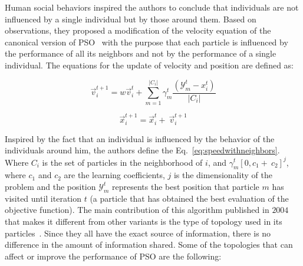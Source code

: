 Human social behaviors inspired the authors to conclude that individuals are not influenced by a single individual but by those around them. Based on observations, they proposed a modification of the velocity equation of the canonical version of PSO~\cite{kennedy1995particle} with the purpose that each particle is influenced by the performance of all its neighbors and not by the performance of a single individual. The equations for the update of velocity and position are defined as: 

\begin{equation}\label{eq:speedwithneighbors}
      \vec{v}_i^{t+1}=w\vec{v}_i^t+\sum_{m=1}^{\left|C_i\right|}{\gamma_m^t\frac{(\mathcal{Y}_m^t-x_i^t)}{\left|C_i\right|}}
\end{equation}

\begin{equation}
       \vec{x}_i^{t+1}=\vec{x}_i^t +\ \vec{v}_i^{t+1}
\end{equation}


Inspired by the fact that an individual is influenced by the behavior of the individuals around him, the authors define the Eq.~\ref{eq:speedwithneighbors}. Where $C_i$ is the set of particles in the neighborhood of $i$, and $\gamma_m^t[0, c_1+\ c_2]^j$, where $c_1$ and $c_2$ are the learning coefficients, $j$ is the dimensionality of the problem and the position $\mathcal{Y}_m^t$ represents the best position that particle $m$ has visited until iteration $t$ (a particle that has obtained the best evaluation of the objective function).
The main contribution of this algorithm published in $2004$ that makes it different from other variants is the type of topology used in its particles~\cite{mendes2004population}. Since they all have the exact source of information, there is no difference in the amount of information shared. Some of the topologies that can affect or improve the performance of PSO are the following:

